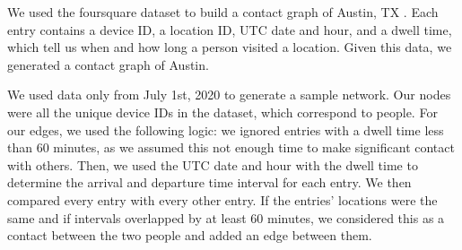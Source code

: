 \documentclass[times, 10pt,twocolumn]{article}
\begin{document}














We used the foursquare dataset to build a contact graph of Austin, TX \cite{DVN/PFLAH4_2020}. Each entry contains a device ID, a location ID, UTC date and hour, and a dwell time, which tell us when and how long a person visited a location. Given this data, we generated a contact graph of Austin.

We used data only from July 1st, 2020 to generate a sample network. Our nodes were all the unique device IDs in the dataset, which correspond to people. For our edges, we used the following logic: we ignored entries with a dwell time less than 60 minutes, as we assumed this not enough time to make significant contact with others. Then, we used the UTC date and hour with the dwell time to determine the arrival and departure time interval for each entry. We then compared every entry with every other entry. If the entries' locations were the same and if intervals overlapped by at least 60 minutes, we considered this as a contact between the two people and added an edge between them.

\end{document}
